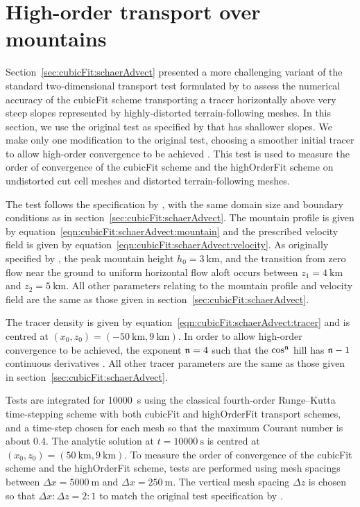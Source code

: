 \section{High-order transport over mountains}
\label{sec:highOrderFit:schaerAdvectSmooth}

Section~\ref{sec:cubicFit:schaerAdvect} presented a more challenging variant of the standard two-dimensional transport test formulated by \citet{schaer2002} to assess the numerical accuracy of the cubicFit scheme transporting a tracer horizontally above very steep slopes represented by highly-distorted terrain-following meshes.
In this section, we use the original test as specified by \citet{schaer2002} that has shallower slopes.  We make only one modification to the original test, choosing a smoother initial tracer to allow high-order convergence to be achieved \citep{holdaway2008}.
This test is used to measure the order of convergence of the cubicFit scheme and the highOrderFit scheme on undistorted cut cell meshes and distorted terrain-following meshes.

The test follows the specification by \citet{schaer2002}, with the same domain size and boundary conditions as in section~\ref{sec:cubicFit:schaerAdvect}.
The mountain profile is given by equation~\eqref{eqn:cubicFit:schaerAdvect:mountain} and the prescribed velocity field is given by equation~\eqref{eqn:cubicFit:schaerAdvect:velocity}.
As originally specified by \citet{schaer2002}, the peak mountain height $h_0 = \SI{3}{\kilo\meter}$, and the transition from zero flow near the ground to uniform horizontal flow aloft occurs between $z_1 = \SI{4}{\kilo\meter}$ and $z_2 = \SI{5}{\kilo\meter}$.
All other parameters relating to the mountain profile and velocity field are the same as those given in section~\ref{sec:cubicFit:schaerAdvect}.

The tracer density is given by equation~\eqref{eqn:cubicFit:schaerAdvect:tracer} and is centred at $(x_0, z_0) = (\SI{-50}{\kilo\meter}, \SI{9}{\kilo\meter})$.  In order to allow high-order convergence to be achieved, the exponent $\mathfrak{n} = 4$ such that the $\cos^{\mathfrak{n}}$ hill has $\mathfrak{n} - 1$ continuous derivatives \citep{holdaway2008}.
All other tracer parameters are the same as those given in section~\ref{sec:cubicFit:schaerAdvect}.

Tests are integrated for \SI{10000}{\second} using the classical fourth-order Runge–Kutta time-stepping scheme \citep[p. 53]{durran2013} with both cubicFit and highOrderFit transport schemes, and a time-step chosen for each mesh so that the maximum Courant number is about \num{0.4}.  
The analytic solution at $t = \SI{10000}{\second}$ is centred at $(x_0, z_0) = (\SI{50}{\kilo\meter}, \SI{9}{\kilo\meter})$.
To measure the order of convergence of the cubicFit scheme and the highOrderFit scheme, tests are performed using mesh spacings between $\Delta x = \SI{5000}{\meter}$ and $\Delta x = \SI{250}{\meter}$.
The vertical mesh spacing $\Delta z$ is chosen so that $\Delta x \mathbin{:} \Delta z = 2\mathbin{:}1$ to match the original test specification by \citet{schaer2002}.

